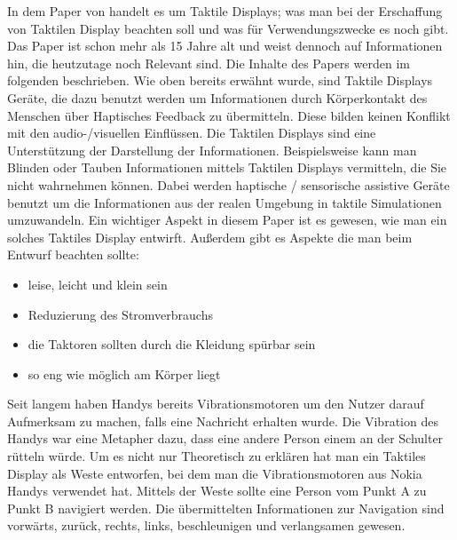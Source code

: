
In dem Paper von \cite{gemperle2001design} handelt es um Taktile Displays; 
was man bei der Erschaffung von Taktilen Display beachten soll und was f{\"u}r Verwendungszwecke es noch gibt. 
Das Paper ist schon mehr als 15 Jahre alt und weist dennoch auf Informationen hin, die heutzutage noch Relevant sind. 
Die Inhalte des Papers werden im folgenden beschrieben.
Wie oben bereits erwähnt wurde, sind Taktile Displays Ger{\"a}te, die dazu benutzt werden um Informationen durch K{\"o}rperkontakt des Menschen {\"u}ber Haptisches Feedback zu {\"u}bermitteln. Diese bilden keinen Konflikt mit den audio-/visuellen Einfl{\"u}ssen. 
Die Taktilen Displays sind eine Unterst{\"u}tzung der Darstellung der Informationen. 
Beispielsweise kann man Blinden oder Tauben Informationen mittels Taktilen Displays vermitteln, die Sie nicht wahrnehmen k{\"o}nnen.
Dabei werden haptische / sensorische assistive Ger{\"a}te benutzt um die Informationen aus der realen Umgebung in taktile Simulationen umzuwandeln.
Ein wichtiger Aspekt in diesem Paper ist es gewesen, wie man ein solches Taktiles Display entwirft.
Außerdem gibt es Aspekte die man beim Entwurf beachten sollte:
\begin{itemize}
\item leise, leicht und klein sein
\item Reduzierung des Stromverbrauchs
\item die Taktoren sollten durch die Kleidung sp{\"u}rbar sein
\item so eng wie m{\"o}glich am K{\"o}rper liegt
\end{itemize}
Seit langem haben Handys bereits Vibrationsmotoren um den Nutzer darauf Aufmerksam zu machen, falls eine Nachricht erhalten wurde.
Die Vibration des Handys war eine Metapher dazu, dass eine andere Person einem an der Schulter r{\"u}tteln w{\"u}rde. \cite{gemperle2001design} 
Um es nicht nur Theoretisch zu erkl{\"a}ren hat man ein Taktiles Display als Weste entworfen, bei dem man die Vibrationsmotoren aus Nokia Handys verwendet hat. Mittels der Weste sollte eine Person vom Punkt A zu Punkt B navigiert werden. 
Die {\"u}bermittelten Informationen zur Navigation sind vorw{\"a}rts, zur{\"u}ck, rechts, links, beschleunigen und verlangsamen gewesen. 